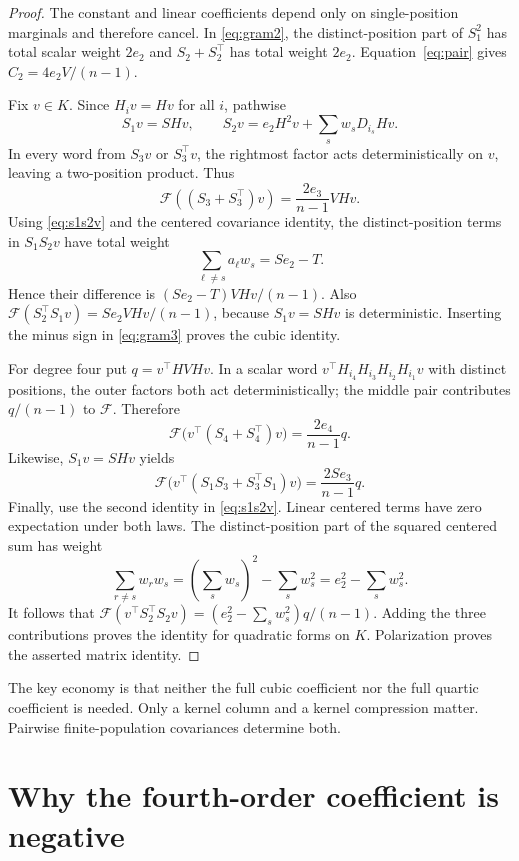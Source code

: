 \documentclass[11pt,letterpaper]{article}
\numberwithin{equation}{section}
\theoremstyle{definition}
\newcommand{\calF}{\mathcal F}
\begin{document}
\begin{proof}
The constant and linear coefficients depend only on single-position marginals and therefore cancel. In \eqref{eq:gram2}, the distinct-position part of $S_1^2$ has total scalar weight $2e_2$ and $S_2+S_2^\top$ has total weight $2e_2$. Equation~\eqref{eq:pair} gives $C_2=4e_2V/(n-1)$.

Fix $v\in K$. Since $H_iv=Hv$ for all $i$, pathwise
\begin{equation}\label{eq:s1s2v}
 S_1v=SHv,\qquad
 S_2v=e_2H^2v+\sum_s w_sD_{i_s}Hv.
\end{equation}
In every word from $S_3v$ or $S_3^\top v$, the rightmost factor acts deterministically on $v$, leaving a two-position product. Thus
\[
 \calF((S_3+S_3^\top)v)=\frac{2e_3}{n-1}VHv.
\]
Using \eqref{eq:s1s2v} and the centered covariance identity, the distinct-position terms in $S_1S_2v$ have total weight
\[
 \sum_{\ell\ne s}a_\ell w_s=Se_2-T.
\]
Hence their difference is $(Se_2-T)VHv/(n-1)$. Also
$\calF(S_2^\top S_1v)=Se_2VHv/(n-1)$, because $S_1v=SHv$ is deterministic. Inserting the minus sign in \eqref{eq:gram3} proves the cubic identity.

For degree four put $q=v^\top HVHv$. In a scalar word $v^\top H_{i_4}H_{i_3}H_{i_2}H_{i_1}v$ with distinct positions, the outer factors both act deterministically; the middle pair contributes $q/(n-1)$ to $\calF$. Therefore
\[
 \calF\bigl(v^\top(S_4+S_4^\top)v\bigr)=\frac{2e_4}{n-1}q.
\]
Likewise, $S_1v=SHv$ yields
\[
 \calF\bigl(v^\top(S_1S_3+S_3^\top S_1)v\bigr)
 =\frac{2Se_3}{n-1}q.
\]
Finally, use the second identity in \eqref{eq:s1s2v}. Linear centered terms have zero expectation under both laws. The distinct-position part of the squared centered sum has weight
\[
 \sum_{r\ne s}w_rw_s=\left(\sum_s w_s\right)^2-\sum_s w_s^2
 =e_2^2-\sum_s w_s^2.
\]
It follows that
$\calF(v^\top S_2^\top S_2v)=(e_2^2-\sum_s w_s^2)q/(n-1)$.
Adding the three contributions proves the identity for quadratic forms on $K$. Polarization proves the asserted matrix identity.
\end{proof}

The key economy is that neither the full cubic coefficient nor the full quartic coefficient is needed. Only a kernel column and a kernel compression matter. Pairwise finite-population covariances determine both.

\section{Why the fourth-order coefficient is negative}
\label{sec:proof}
\end{document}
